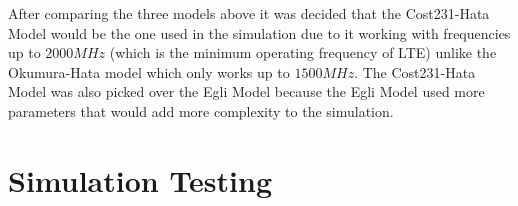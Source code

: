 After comparing the three models above it was decided that the Cost231-Hata Model would be the one used in the simulation due to it working with frequencies up to $2000 MHz$ (which is the minimum operating frequency of LTE) unlike the Okumura-Hata model which only works up to $1500 MHz$. The Cost231-Hata Model was also picked over the Egli Model because the Egli Model used more parameters that would add more complexity to the simulation.~\cite{chebil2011comparison, shabbir2011comparison}

\section{Simulation Testing}